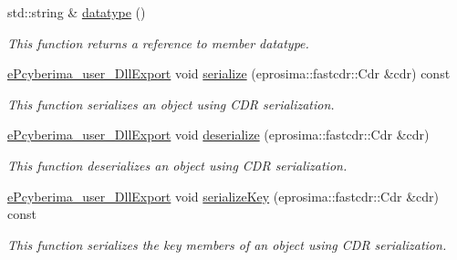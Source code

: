 \begin{DoxyCompactItemize}
std\-::string \& \hyperlink{classapollo_1_1cyber_1_1transport_1_1UnderlayMessage_aaad0b2ea863a3647a2ef83d97bda3594}{datatype} ()
\begin{DoxyCompactList}\small\item\em This function returns a reference to member datatype. \end{DoxyCompactList}\item 
\hyperlink{underlay__message_8h_a72796233f09f587d949ca1aa9842453d}{e\-Pcyberima\-\_\-user\-\_\-\-Dll\-Export} void \hyperlink{classapollo_1_1cyber_1_1transport_1_1UnderlayMessage_a361c2d275b269f10e446c67e2dfa81ee}{serialize} (eprosima\-::fastcdr\-::\-Cdr \&cdr) const 
\begin{DoxyCompactList}\small\item\em This function serializes an object using C\-D\-R serialization. \end{DoxyCompactList}\item 
\hyperlink{underlay__message_8h_a72796233f09f587d949ca1aa9842453d}{e\-Pcyberima\-\_\-user\-\_\-\-Dll\-Export} void \hyperlink{classapollo_1_1cyber_1_1transport_1_1UnderlayMessage_add841d5035f389f03de2df6dc5adae5a}{deserialize} (eprosima\-::fastcdr\-::\-Cdr \&cdr)
\begin{DoxyCompactList}\small\item\em This function deserializes an object using C\-D\-R serialization. \end{DoxyCompactList}\item 
\hyperlink{underlay__message_8h_a72796233f09f587d949ca1aa9842453d}{e\-Pcyberima\-\_\-user\-\_\-\-Dll\-Export} void \hyperlink{classapollo_1_1cyber_1_1transport_1_1UnderlayMessage_a4557155a3c01a0bba2b8c960d43e6b34}{serialize\-Key} (eprosima\-::fastcdr\-::\-Cdr \&cdr) const 
\begin{DoxyCompactList}\small\item\em This function serializes the key members of an object using C\-D\-R serialization. \end{DoxyCompactList}\end{DoxyCompactItemize}

